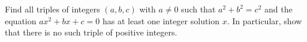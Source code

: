 Find all triples of integers $(a,b,c)$ with $a\ne0$ such that $a^2+b^2=c^2$ and the equation $ax^2+bx+c=0$ has at least one integer solution $x$. In particular, show that there is no such triple of positive integers.
